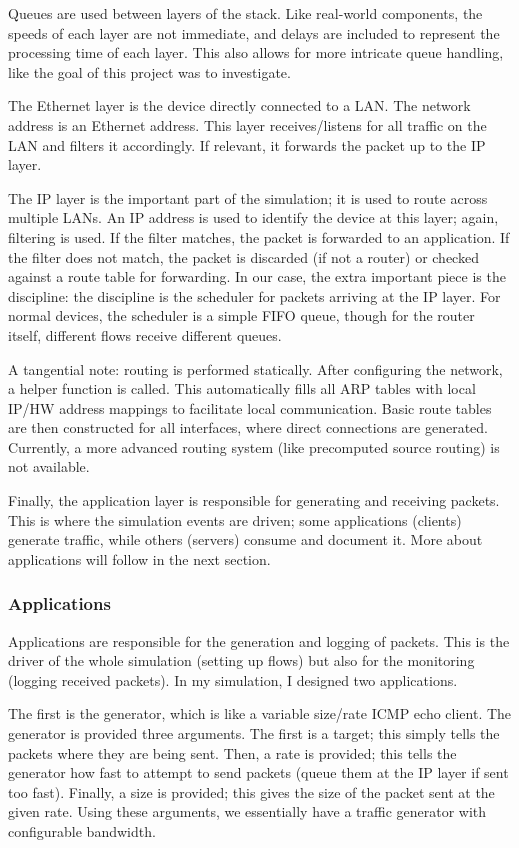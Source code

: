 \documentclass[conference]{IEEEtran}
\begin{document}
Queues are used between layers of the stack.
Like real-world components, the speeds of each layer are not immediate, and delays
are included to represent the processing time of each layer.
This also allows for more intricate queue handling, like the goal of this project was to investigate.

The Ethernet layer is the device directly connected to a LAN.
The network address is an Ethernet address.
This layer receives/listens for all traffic on the LAN and filters it accordingly.
If relevant, it forwards the packet up to the IP layer.

The IP layer is the important part of the simulation; it is used to route across multiple LANs.
An IP address is used to identify the device at this layer; again, filtering is used.
If the filter matches, the packet is forwarded to an application.
If the filter does not match, the packet is discarded (if not a router) or checked against a route table for forwarding.
In our case, the extra important piece is the discipline: the discipline is the scheduler for packets arriving at the IP layer.
For normal devices, the scheduler is a simple FIFO queue, though for the router itself, different flows receive different
queues.

A tangential note: routing is performed statically.
After configuring the network, a helper function is called.
This automatically fills all ARP tables with local IP/HW address mappings to facilitate local communication.
Basic route tables are then constructed for all interfaces, where direct connections are generated.
Currently, a more advanced routing system (like precomputed source routing) is not available.

Finally, the application layer is responsible for generating and receiving packets.
This is where the simulation events are driven; some applications (clients) generate traffic, while others (servers)
consume and document it.
More about applications will follow in the next section.

    \subsubsection{Applications}
Applications are responsible for the generation and logging of packets.
This is the driver of the whole simulation (setting up flows) but also for the monitoring (logging received packets).
In my simulation, I designed two applications.

The first is the generator, which is like a variable size/rate ICMP echo client.
The generator is provided three arguments.
The first is a target; this simply tells the packets where they are being sent.
Then, a rate is provided; this tells the generator how fast to attempt to send packets (queue them at the IP layer if sent too fast).
Finally, a size is provided; this gives the size of the packet sent at the given rate.
Using these arguments, we essentially have a traffic generator with configurable bandwidth.
\end{document}
